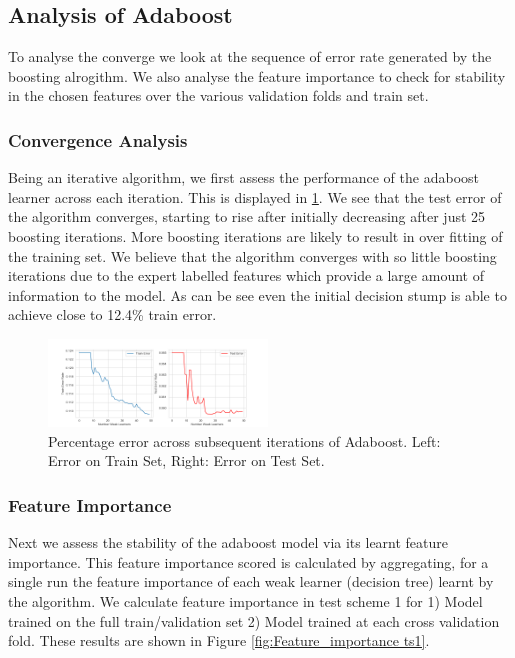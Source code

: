 \documentclass[11pt, letterpaper, journal]{IEEEtran}
\begin{document}
\subsection{Analysis of Adaboost}
To analyse the converge we look at the sequence of error rate generated by the boosting alrogithm. We also analyse the feature importance to check for stability in the chosen features over the various validation folds and train set.
\subsubsection{Convergence Analysis}
Being an iterative algorithm, we first assess the performance of the adaboost learner across each iteration. This is displayed in \ref{fig:Adaboost_iterations}. We see that the test error of the algorithm converges, starting to rise after initially decreasing after just 25 boosting iterations. More boosting iterations are likely to result in over fitting of the training set. We believe that the algorithm converges with so little boosting iterations due to the expert labelled features which provide a large amount of information to the model. As can be see even the initial decision stump is able to achieve close to 12.4\% train error.

\begin{figure}[h]
\centering
\includegraphics[width=0.52\textwidth]{statics/ada_iterations.png}
\caption{Percentage error across subsequent iterations of Adaboost. Left: Error on Train Set, Right: Error on Test Set.}
\label{fig:Adaboost_iterations}
\end{figure}


\subsubsection{Feature Importance}
Next we assess the stability of the adaboost model via its learnt feature importance. This feature importance scored is calculated by aggregating, for a single run the feature importance of each weak learner (decision tree) learnt by the algorithm. We calculate feature importance in test scheme 1 for 1) Model trained on the full train/validation set 2) Model trained at each cross validation fold. These results are shown in Figure \ref{fig:Feature_importance ts1}.
\end{document}
